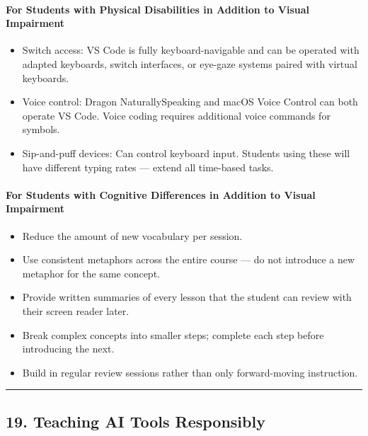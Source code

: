 \documentclass[
  justified,
  openright,
]{tufte-book}
\let\subsubsection\paragraph
\let\paragraph\paragraph
\let\subsubsection\paragraph
\let\paragraph\paragraph
\providecommand{\tightlist}{%
  \setlength{\itemsep}{0pt}\setlength{\parskip}{0pt}}
\begin{document}
\subsubsection{For Students with Physical Disabilities in Addition to
Visual
Impairment}\label{for-students-with-physical-disabilities-in-addition-to-visual-impairment}

\begin{itemize}
\tightlist
\item
  Switch access: VS Code is fully keyboard-navigable and can be operated
  with adapted keyboards, switch interfaces, or eye-gaze systems paired
  with virtual keyboards.
\item
  Voice control: Dragon NaturallySpeaking and macOS Voice Control can
  both operate VS Code. Voice coding requires additional voice commands
  for symbols.
\item
  Sip-and-puff devices: Can control keyboard input. Students using these
  will have different typing rates --- extend all time-based tasks.
\end{itemize}

\subsubsection{For Students with Cognitive Differences in Addition to
Visual
Impairment}\label{for-students-with-cognitive-differences-in-addition-to-visual-impairment}

\begin{itemize}
\tightlist
\item
  Reduce the amount of new vocabulary per session.
\item
  Use consistent metaphors across the entire course --- do not introduce
  a new metaphor for the same concept.
\item
  Provide written summaries of every lesson that the student can review
  with their screen reader later.
\item
  Break complex concepts into smaller steps; complete each step before
  introducing the next.
\item
  Build in regular review sessions rather than only forward-moving
  instruction.
\end{itemize}

\begin{center}\rule{0.5\linewidth}{0.5pt}\end{center}

\subsection{19. Teaching AI Tools
Responsibly}\label{teaching-ai-tools-responsibly}
\end{document}
